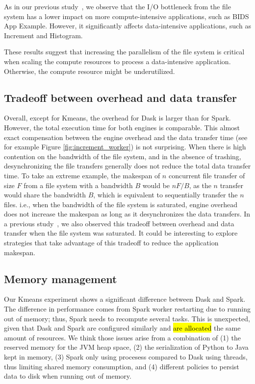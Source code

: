 \documentclass[AMA,STIX1COL]{WileyNJD-v2}
\newcommand{\HL}[1]{\hl{#1}}
\begin{document}
As in our previous study~\cite{8943502}, we observe that the I/O bottleneck from the file system has a lower impact on more compute-intensive applications, such as BIDS App Example.
However, it significantly affects data-intensive applications, such as Increment and Histogram.
		
These results suggest that increasing the parallelism of the file system is critical when scaling the compute resources to process a data-intensive application.
Otherwise, the compute resource might be underutilized.
		
\subsection{Tradeoff between overhead and data transfer}
Overall, except for Kmeans, the overhead for Dask is larger than for Spark.
However, the total execution time for both engines is comparable.
This almost exact compensation between the engine overhead and the data transfer time (see for example Figure \ref{fig:increment_worker}) is not surprising.
When there is high contention on the bandwidth of the file system, and in the absence of trashing, desynchronizing the file transfers generally does not reduce the total data transfer time.
To take an extreme example, the makespan of $n$ concurrent file transfer of size $F$ from a file system with a bandwidth $B$ would be $nF/B$,
as the $n$ transfer would share the bandwidth $B$, which is equivalent to sequentially transfer the $n$ files.
i.e., when the bandwidth of the file system is saturated, engine overhead does not increase the makespan as long as it desynchronizes the data transfers.
In a previous study~\cite{8943502}, we also observed this tradeoff between overhead and data transfer when the file system was saturated.
It could be interesting to explore strategies that take advantage of this tradeoff to reduce the application makespan.
		
\subsection{Memory management}
Our Kmeans experiment shows a significant difference between Dask and Spark.
The difference in performance comes from Spark worker restarting due to running out of memory; thus, Spark needs to recompute several tasks.
This is unexpected, given that Dask and Spark are configured similarly and \HL{are allocated} the same amount of resources.
We think those issues arise from a combination of
(1) the reserved memory for the JVM heap space,
(2) the serialization of Python to Java kept in memory,
(3) Spark only using procesess compared to Dask using threads, thus limiting shared memory consumption,
and (4) different policies to persist data to disk when running out of memory.
		
\end{document}

